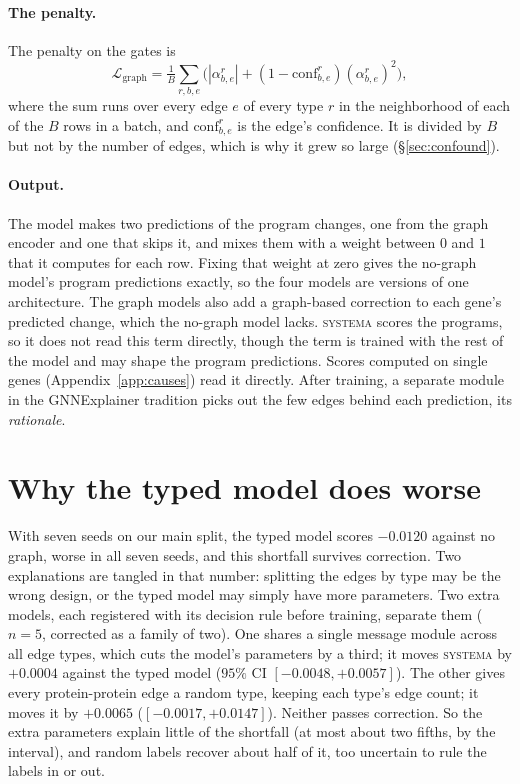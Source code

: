 \documentclass{article}
\begin{document}
\paragraph{The penalty.} The penalty on the gates is
\begin{equation}
\mathcal{L}_{\mathrm{graph}}=\tfrac{1}{B}\sum_{r,b,e}\big(|\alpha^{r}_{b,e}| + (1-\mathrm{conf}^{r}_{b,e})(\alpha^{r}_{b,e})^2\big),
\label{eq:graphloss}
\end{equation}
where the sum runs over every edge $e$ of every type $r$ in the neighborhood of each of the $B$ rows in a
batch, and $\mathrm{conf}^{r}_{b,e}$ is the edge's confidence. It is divided by $B$ but not by the number
of edges, which is why it grew so large (\S\ref{sec:confound}).

\paragraph{Output.} The model makes two predictions of the program changes, one from the graph encoder and
one that skips it, and mixes them with a weight between $0$ and $1$ that it computes for each row. Fixing
that weight at zero gives the no-graph model's program predictions exactly, so the four models are versions
of one architecture. The graph models also add a graph-based correction to each gene's predicted change,
which the no-graph model lacks. \textsc{systema} scores the programs, so it does not read this term
directly, though the term is trained with the rest of the model and may shape the program predictions.
Scores computed on single genes (Appendix~\ref{app:causes}) read it directly.
After training, a separate module in the GNNExplainer tradition \citep{ying2019gnnexplainer} picks out the
few edges behind each prediction, its \emph{rationale}.

\section{Why the typed model does worse}
\label{app:mechanism}

With seven seeds on our main split, the typed model scores $-0.0120$ against no graph, worse in all seven
seeds, and this shortfall survives correction. Two explanations are tangled in that number: splitting the
edges by type may be the wrong design, or the typed model may simply have more parameters. Two extra
models, each registered with its decision rule before training, separate them ($n{=}5$, corrected as a
family of two). One shares a single message module across all edge types, which cuts the model's
parameters by a third; it moves \textsc{systema} by $+0.0004$ against the typed model ($95\%$ CI
$[-0.0048,+0.0057]$). The other gives every protein-protein edge a random type, keeping each type's edge
count; it moves it by $+0.0065$ ($[-0.0017,+0.0147]$). Neither passes correction. So the extra parameters
explain little of the shortfall (at most about two fifths, by the interval), and random labels recover
about half of it, too uncertain to rule the labels in or out.
\end{document}
